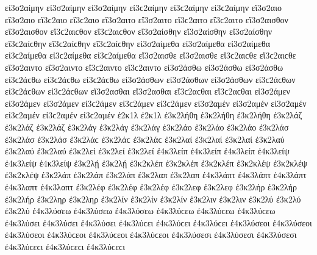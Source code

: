 {%
εἰ3σ2αίμην εἰ3σ2αίμην εἰ3σ2αίμην εἰ3ϲ2αίμην εἰ3ϲ2αίμην εἰ3ϲ2αίμην 
εἴ3σ2αιο εἴ3σ2αιο εἴ3ϲ2αιο εἴ3ϲ2αιο 
εἴ3σ2αιτο εἴ3σ2αιτο εἴ3ϲ2αιτο εἴ3ϲ2αιτο 
εἴ3σ2αισθον εἴ3σ2αισθον εἴ3ϲ2αιϲθον εἴ3ϲ2αιϲθον 
εἴ3σ2αίσθην εἴ3σ2αίσθην εἴ3σ2αίσθην εἴ3ϲ2αίϲθην εἴ3ϲ2αίϲθην εἴ3ϲ2αίϲθην 
εἰ3σ2αίμεθα εἰ3σ2αίμεθα εἰ3σ2αίμεθα εἰ3ϲ2αίμεθα εἰ3ϲ2αίμεθα εἰ3ϲ2αίμεθα 
εἴ3σ2αισθε εἴ3σ2αισθε εἴ3ϲ2αιϲθε εἴ3ϲ2αιϲθε 
εἴ3σ2αιντο εἴ3σ2αιντο εἴ3ϲ2αιντο εἴ3ϲ2αιντο 
%
εἰ3σ2άσθω εἰ3σ2άσθω εἰ3σ2άσθω εἰ3ϲ2άϲθω εἰ3ϲ2άϲθω εἰ3ϲ2άϲθω 
εἰ3σ2άσθων εἰ3σ2άσθων εἰ3σ2άσθων εἰ3ϲ2άϲθων εἰ3ϲ2άϲθων εἰ3ϲ2άϲθων 
%
εἴ3σ2ασθαι εἴ3σ2ασθαι εἴ3ϲ2αϲθαι εἴ3ϲ2αϲθαι 
εἰ3σ2άμεν εἰ3σ2άμεν εἰ3σ2άμεν εἰ3ϲ2άμεν εἰ3ϲ2άμεν εἰ3ϲ2άμεν   %
εἰ3σ2αμέν εἰ3σ2αμέν εἰ3σ2αμέν εἰ3ϲ2αμέν εἰ3ϲ2αμέν εἰ3ϲ2αμέν 
%	
ἐ2κ1λ ἐ2κ1λ   %
ἐ3κ2λήθη ἐ3κ2λήθη ἐ3κ2λήθη   %
ἐ3κ2λάζ ἐ3κ2λάζ ἐ3κ2λάζ   %
ἐ3κ2λάγ ἐ3κ2λάγ ἐ3κ2λάγ   %
ἐ3κ2λάο ἐ3κ2λάο ἐ3κ2λάο   %
ἐ3κ2λάσ ἐ3κ2λάσ ἐ3κ2λάσ ἐ3κ2λάϲ ἐ3κ2λάϲ ἐ3κ2λάϲ   %
ἐ3κ2λαί ἐ3κ2λαί ἐ3κ2λαί   %
ἐ3κ2λαύ ἐ3κ2λαύ ἐ3κ2λαύ   %
ἐ3κ2λεί ἐ3κ2λεί ἐ3κ2λεί   %
ἐ4κ3λείπ ἐ4κ3λείπ ἐ4κ3λείπ   %
ἐ4κ3λείψ ἐ4κ3λείψ ἐ4κ3λείψ   %
ἐ3κ2λῄ ἐ3κ2λῄ   %
ἐ3κ2κλέπ ἐ3κ2κλέπ ἐ3κ2κλέπ   %
ἐ3κ2κλέψ ἐ3κ2κλέψ ἐ3κ2κλέψ   %
ἐ3κ2λάπ ἐ3κ2λάπ ἐ3κ2λάπ   %
ἐ3κ2λαπ ἐ3κ2λαπ   %
ἐ4κ3λάπτ ἐ4κ3λάπτ ἐ4κ3λάπτ   %
ἐ4κ3λαπτ ἐ4κ3λαπτ 
ἐ3κ2λέφ ἐ3κ2λέφ ἐ3κ2λέφ   %
ἐ3κ2λεφ ἐ3κ2λεφ   %
ἐ3κ2λήρ ἐ3κ2λήρ ἐ3κ2λήρ   %
ἐ3κ2ληρ ἐ3κ2ληρ   %
ἐ3κ2λίν ἐ3κ2λίν ἐ3κ2λίν   %
ἐ3κ2λιν ἐ3κ2λιν   %
ἐ3κ2λύ ἐ3κ2λύ ἐ3κ2λύ   %
ἐ4κ3λύσεω ἐ4κ3λύσεω ἐ4κ3λύσεω ἐ4κ3λύϲεω ἐ4κ3λύϲεω ἐ4κ3λύϲεω   %
ἐ4κ3λύσει ἐ4κ3λύσει ἐ4κ3λύσει ἐ4κ3λύϲει ἐ4κ3λύϲει ἐ4κ3λύϲει 
ἐ4κ3λύσεοι ἐ4κ3λύσεοι ἐ4κ3λύσεοι ἐ4κ3λύϲεοι ἐ4κ3λύϲεοι ἐ4κ3λύϲεοι 
ἐ4κ3λύσεσι ἐ4κ3λύσεσι ἐ4κ3λύσεσι ἐ4κ3λύϲεϲι ἐ4κ3λύϲεϲι ἐ4κ3λύϲεϲι 
}
